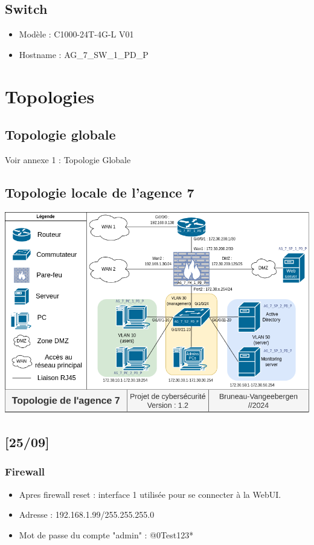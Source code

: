 \documentclass[a4paper,12pt]{article}
\begin{document}
\subsection{Switch}
\begin{itemize}
\item Modèle : C1000-24T-4G-L V01
\item Hostname : AG\_7\_SW\_1\_PD\_P
\end{itemize}
\newpage
\section{Topologies}
\subsection{Topologie globale}
Voir annexe 1 : Topologie Globale
\subsection{Topologie locale de l'agence 7}
\includegraphics[width=1\textwidth]{topo_locale.png}

\newpage


\subsection{[25/09]}

\subsubsection{Firewall}

\begin{itemize}
\item Apres firewall reset : interface 1 utilisée pour se connecter à la WebUI.
\item Adresse : 192.168.1.99/255.255.255.0
\item Mot de passe du compte "admin" : @0Test123*
\end{itemize}
\end{document}

